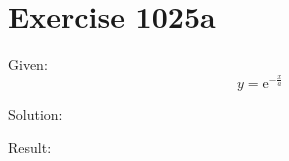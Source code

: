 \documentclass[a4paper, 10pt]{scrartcl}
\newcommand*\euler{\mathrm{e}}
\begin{document}
\section{Exercise 1025a}

Given:
\[
y = \euler^{-\frac{x}{a}}
\]

Solution:

Result:
\end{document}
